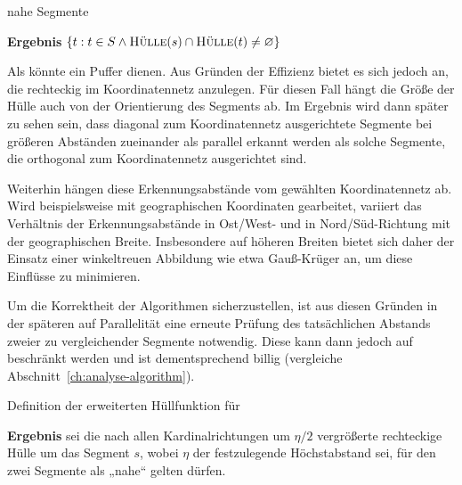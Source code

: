 \documentclass[../main/thesis.tex]{subfiles}
\begin{document}


\begin{algorithmhere}{nahe Segmente}
\label{alg:NaheSegmente}
\begin{algorithmic}
	\State \textbf{Ergebnis} $\{t : t \in S \wedge \textproc{Hülle}(s) \cap \textproc{Hülle}(t) \neq \varnothing\}$
\EndFunction
\end{algorithmic}
\end{algorithmhere}

Als  könnte ein Puffer dienen.
Aus Gründen der Effizienz bietet es sich jedoch an, die  rechteckig im Koordinatennetz anzulegen.
Für diesen Fall hängt die Größe der Hülle auch von der Orientierung des Segments ab.
Im Ergebnis wird dann später zu sehen sein, dass diagonal zum Koordinatennetz ausgerichtete Segmente bei größeren Abständen zueinander als parallel erkannt werden als solche Segmente, die orthogonal zum Koordinatennetz ausgerichtet sind.

Weiterhin hängen diese Erkennungsabstände vom gewählten Koordinatennetz ab.
Wird beispielsweise mit geographischen Koordinaten gearbeitet, variiert das Verhältnis der Erkennungsabstände in Ost/West- und in Nord/Süd-Richtung mit der geographischen Breite.
Insbesondere auf höheren Breiten bietet sich daher der Einsatz einer winkeltreuen Abbildung wie etwa Gauß-Krüger an, um diese Einflüsse zu minimieren.

Um die Korrektheit der Algorithmen sicherzustellen, ist aus diesen Gründen in der späteren  auf Parallelität eine erneute Prüfung des tatsächlichen Abstands zweier zu vergleichender Segmente notwendig.
Diese kann dann jedoch auf  beschränkt werden und ist dementsprechend billig (vergleiche Abschnitt~\ref{ch:analyse-algorithm}).


\begin{algorithmhere}{Definition der erweiterten Hüllfunktion für }
\label{alg:Huelle}
\begin{algorithmic}
	\State \textbf{Ergebnis} sei die nach allen Kardinalrichtungen um $\eta/2$ vergrößerte rechteckige Hülle um das Segment $s$, wobei $\eta$ der festzulegende Höchstabstand sei, für den zwei Segmente als „nahe“ gelten dürfen.
\EndFunction
\end{algorithmic}
\end{algorithmhere}
\end{document}
